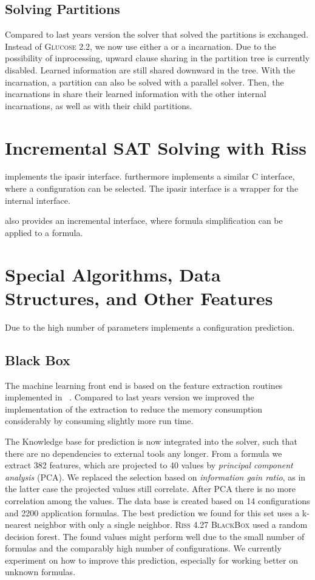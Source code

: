 \documentclass[conference]{IEEEtran}
\begin{document}
\subsection{Solving Partitions}

Compared to last years version the solver that solved the partitions is exchanged. 
Instead of \textsc{Glucose 2.2}, we now use either a \riss or a \priss incarnation. 
Due to the possibility of inprocessing, upward clause sharing in the partition tree is currently disabled. 
Learned information are still shared downward in the tree. 
With the \priss incarnation, a partition can also be solved with a parallel solver. 
Then, the incarnations in \priss share their learned information with the other internal incarnations, as well as with their child partitions.

\section{Incremental SAT Solving with Riss}

\riss implements the ipasir interface. 
\riss furthermore implements a similar C interface, where a configuration can be selected. 
The ipasir interface is a wrapper for the internal interface. 

\coprocessor also provides an incremental interface, where formula simplification can be applied to a formula.

\section{Special Algorithms, Data Structures, and Other Features}

Due to the high number of parameters \riss implements a configuration prediction. 

\subsection{Black Box}

The machine learning front end is based on the feature extraction routines implemented in \riss~\cite{Mblackbox}. 
Compared to last years version we improved the implementation of the extraction to reduce the memory consumption considerably by consuming slightly more run time. 

The Knowledge base for prediction is now integrated into the solver, such that there are no dependencies to external tools any longer. 
From a formula we extract 382 features, which are projected to 40 values by \emph{principal component analysis} (PCA). 
We replaced the selection based on \emph{information gain ratio}, as in the latter case the projected values still correlate. 
After PCA there is no more correlation among the values. 
The data base is created based on 14 configurations and 2200 application formulas. 
The best prediction we found for this set uses a k-nearest neighbor with only a single neighbor.
\textsc{Riss 4.27 BlackBox} used a random decision forest. 
The found values might perform well due to the small number of formulas and the comparably high number of configurations. 
We currently experiment on how to improve this prediction, especially for working better on unknown formulas. 
\end{document}
